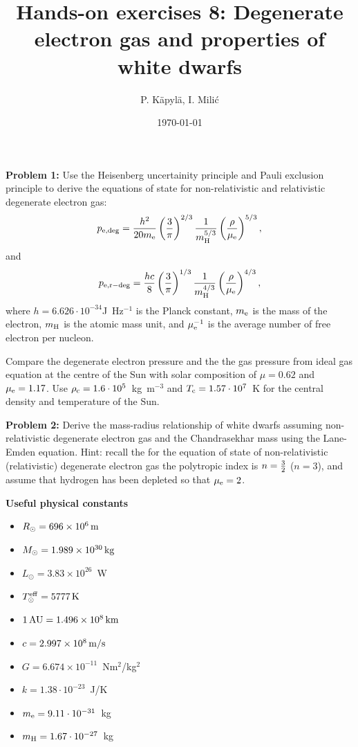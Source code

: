 \documentclass[12pt]{article}
\title{Hands-on exercises 8: Degenerate electron gas and properties of white dwarfs}
\author{P. K\"{a}pyl\"{a}, I. Mili\'{c}}
\date{\today}
\begin{document}
\maketitle

{\bf Problem 1:} Use the Heisenberg uncertainity principle and Pauli
exclusion principle to derive the equations of state for
non-relativistic and relativistic degenerate electron gas:
\begin{equation}
p_{\rm e,deg} = \frac{h^2}{20 m_{\rm e}} \left(\frac{3}{\pi} \right)^{2/3} \frac{1}{m_{\rm H}^{5/3}} \left( \frac{\rho}{\mu_{\rm e}} \right)^{5/3},
\end{equation}
and 
\begin{equation}
p_{\rm e,r-deg} = \frac{hc}{8} \left(\frac{3}{\pi} \right)^{1/3} \frac{1}{m_{\rm H}^{4/3}} \left( \frac{\rho}{\mu_{\rm e}} \right)^{4/3},
\end{equation}
where $h = 6.626\cdot 10^{-34}$J~Hz$^{-1}$ is the Planck constant,
$m_{\rm e}$ is the mass of the electron, $m_{\rm H}$ is the atomic
mass unit, and $\mu_{\rm e}^{-1}$ is the average number of free
electron per nucleon.

Compare the degenerate electron pressure and the the gas pressure from
ideal gas equation at the centre of the Sun with solar composition of
$\mu=0.62$ and $\mu_{\rm e} = 1.17$. Use $\rho_{\rm c} = 1.6\cdot
10^5$~kg~m$^{-3}$ and $T_{\rm c} = 1.57\cdot 10^7$~K for the central
density and temperature of the Sun.

{\bf Problem 2:} Derive the mass-radius relationship of white dwarfs
assuming non-relativistic degenerate electron gas and the
Chandrasekhar mass using the Lane-Emden equation. Hint: recall the for
the equation of state of non-relativistic (relativistic) degenerate
electron gas the polytropic index is $n={3 \over 2}$ ($n=3$), and
assume that hydrogen has been depleted so that $\mu_{\rm e} = 2$.


{\bf Useful physical constants}
\begin{itemize}
  \item $R_{\odot} = 696 \times 10^6\,{\rm m}$
  \item $M_{\odot} = 1.989 \times 10^{30}\,{\rm kg}$
  \item $L_{\odot} = 3.83 \times 10^{26}$~W
  \item $T^{\rm eff}_{\odot} = 5777\,{\rm K}$
  \item $1\,{\rm AU} = 1.496 \times 10^8\,{\rm km}$
  \item $c = 2.997 \times 10^8\,{\rm m/s}$
  \item $G = 6.674 \times 10^{-11}$~Nm$^2$/kg$^2$
  \item $k = 1.38\cdot10^{-23}$~J/K
  \item $m_{\rm e} = 9.11\cdot10^{-31}$~kg
  \item $m_{\rm H} = 1.67\cdot10^{-27}$~kg
\end{itemize}
\end{document}
